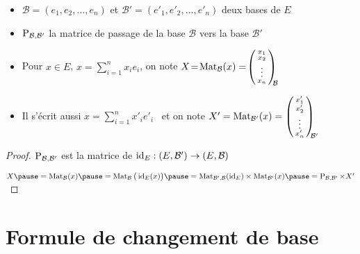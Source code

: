 \begin{frame}

\begin{itemize}


  \item $\mathcal{B}=(e_1, e_2, \ldots ,e_n)$ et 
$\mathcal{B}' = (e'_1, e'_2, \ldots ,e'_n)$ deux bases de $E$

\pause

  \item $\mathop{\text{P}}\nolimits_{\mathcal{B},\mathcal{B}'}$ la matrice de passage de 
la base $\mathcal{B}$ vers la base $\mathcal{B}'$

\pause
  
  \item Pour $x \in E$, $x=\displaystyle\sum_{i=1}^n x_ie_i$\pause, on note $X \!=\! \mathop{\text{Mat}}\nolimits_\mathcal{B} (x) = \!
\left(\begin{smallmatrix}x_1\cr x_2\cr \vdots \cr x_n
\end{smallmatrix}\right)_{\!\!\!\mathcal{B}}$

\pause

  \item Il s'écrit aussi $x=\displaystyle\sum_{i=1}^n x'_ie'_i$ \ \pause et on note $X' = \mathop{\text{Mat}}\nolimits_{\mathcal{B}'} (x) = 
\left(\begin{smallmatrix}x'_1\cr x'_2\cr \vdots \cr x'_n
\end{smallmatrix}\right)_{\!\!\!\mathcal{B}'}$
\end{itemize}
\vspace*{-1ex}
\pause
\begin{proposition}
\end{proposition}
\vspace*{-1ex}
\pause
\begin{proof}
$\mathop{\text{P}}\nolimits_{\mathcal{B},\mathcal{B}'}$ est la matrice de $\mathop{\text{id}}\nolimits_E : (E,\mathcal{B}')\to (E,\mathcal{B})$ 

\pause
\smallskip

\centerline{$X 
\pause
= \Mat_\mathcal{B} (x) 
\pause
= \Mat_{\mathcal{B}} \big( \id_E(x) \big)
\pause
= \Mat_{\mathcal{B}',\mathcal{B}} (\id_E) \times \Mat_{\mathcal{B}'} (x)
\pause
= \Pass_{\mathcal{B},\mathcal{B}'} \times X'$}

\end{proof}

\end{frame}

\section{Formule de changement de base}

